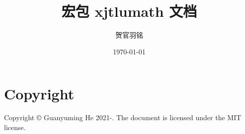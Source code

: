 \documentclass[UTF8]{ctexart}
\title{宏包 xjtlumath 文档}
\author{贺官羽铭}
\date{\today}
\newcommand{\mycprt}{Copyright \copyright{} Guanyuming He 2021-\the\year.}
\begin{document}
\maketitle

\vfill
\section*{Copyright}
\mycprt{} The document is licensed under the MIT license.

\clearpage
{}
\tableofcontents








\end{document}

